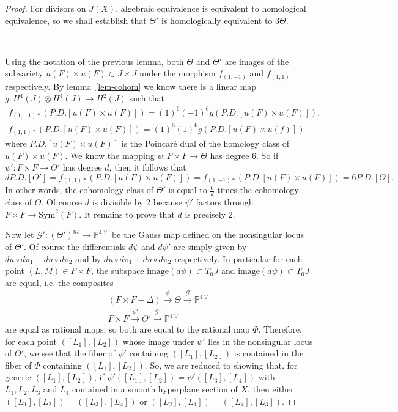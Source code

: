 \documentclass[amssymb,twoside,12 pt,amscd,reqno]{amsart}
\theoremstyle{plain}
\theoremstyle{definition}
\newcommand{\PP}{\mathbb{P}}
\def\ps{\vspace{4pt}}
\newcommand{\lt}{\left}
\newcommand{\rt}{\right}
\begin{document}
\begin{proof}
For divisors on $J(X)$, algebraic equivalence is equivalent to
homological equivalence, so we shall establish that $\Theta'$ is
homologically equivalent to $3\Theta$.  

\

Using the notation of the previous lemma,
both $\Theta$ and $\Theta'$ are images of the subvariety $u(F)\times
u(F) \subset J \times J$ under the morphism $f_{(1,-1)}$ and
$f_{(1,1)}$ respectively.  By lemma~\ref{lem-cohom} we know there is a
linear map $g:H^4(J)\otimes H^4(J)\rightarrow H^2(J)$ such that 
\begin{eqnarray}
f_{(1,-1)*}(P.D.[u(F)\times u(F)]) = (1)^6(-1)^6 g(P.D.[u(F)\times
u(F)]), \\
f_{(1,1)*}(P.D.[u(F)\times u(F)]) = (1)^6(1)^6 g(P.D.[u(F)\times
u(f)]) \nonumber 
\end{eqnarray}
where $P.D.[u(F)\times u(F)]$ is the Poincar\'e dual of the homology
class of $u(F)\times u(F)$.  We know the mapping $\psi: F\times F
\rightarrow \Theta$ has degree $6$.  So if $\psi': F\times
F\rightarrow \Theta'$ has degree $d$, then it follows that
\begin{equation}
d P.D.[\Theta'] = f_{(1,1)*}(P.D.[u(F)\times u(F)]) =
f_{(1,-1)*}(P.D.[u(F)\times u(F)]) = 6 P.D.[\Theta].
\end{equation}
In other words, the cohomology class of $\Theta'$ is equal to
$\frac{6}{d}$ times the cohomology class of $\Theta$.  Of course $d$
is divisible by $2$ because $\psi'$ factors through $F\times F
\rightarrow \text{Sym}^2(F)$.  It remains to prove that $d$ is
precisely $2$.

\ps

Now let $\mathcal{G}':(\Theta')^{ns}\rightarrow \PP^{4\vee}$ be the
Gauss map defined on the nonsingular locus of $\Theta'$.  Of course
the differentials $d\psi$ and $d\psi'$ are simply given by $d u\circ
d\pi_1 - d u\circ d\pi_2$ and by $d u\circ d\pi_1 + d u\circ d\pi_2$
respectively.  In particular for each point $(L,M)\in F\times F$, the
subspace $\text{image}(d\psi)\subset T_0 J$ and
$\text{image}(d\psi)\subset T_0 J$ are equal, i.e. the composites
\begin{eqnarray}
(F\times F-\Delta)\xrightarrow{\psi} \Theta \xrightarrow{\mathcal{G}}
\PP^{4\vee} \\
F\times F\xrightarrow{\psi'} \Theta'
\xrightarrow{{\mathcal{G}}'} \PP^{4\vee}
\end{eqnarray}
are equal as rational maps; so both are equal to the rational map
$\Phi$.  Therefore, for each point $\lt([L_1],[L_2]\rt)$ whose image
under $\psi'$ lies in the nonsingular locus of $\Theta'$, we see that
the fiber of $\psi'$ containing $\lt([L_1],[L_2]\rt)$ is contained in
the fiber of $\Phi$ containing $\lt([L_1],[L_2]\rt)$.  So, we are
reduced to showing that, for generic $\lt([L_1],[L_2]\rt)$, if
$\psi'\lt([L_1],[L_2]\rt)=\psi'\lt([L_3],[L_4]\rt)$ with $L_1,L_2,L_3$
and $L_4$ contained in a smooth hyperplane section of $X$, then either
$\lt([L_1],[L_2]\rt)=\lt([L_3],[L_4]\rt)$ or
$\lt([L_2],[L_1]\rt)=\lt([L_4],[L_3]\rt)$.


\end{proof}
\end{document}
